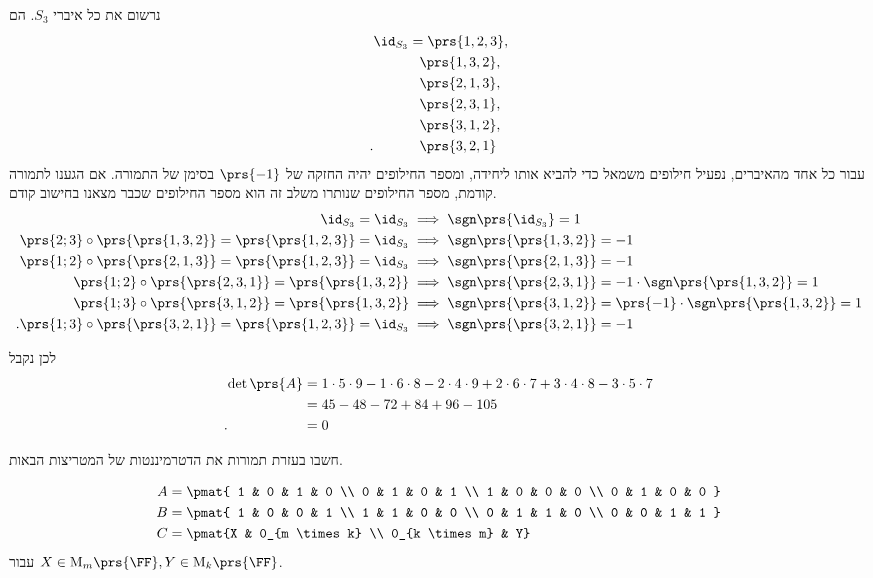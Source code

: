 \documentclass[a4paper,10pt,twoside,openany]{book}
\renewcommand{\Mat}{\mathrm{M}}
\begin{document}
\begin{solution}
נרשום את כל איברי
$S_3$.
הם
\begin{align*}
\id_{S_3} &= \prs{1, 2, 3}, \\
&\hphantom{=} \prs{1, 3, 2}, \\
&\hphantom{=} \prs{2, 1, 3}, \\
&\hphantom{=} \prs{2, 3, 1}, \\
&\hphantom{=} \prs{3, 1, 2}, \\
\text{.} \hphantom{\id_{S_3}} &\hphantom{=} \prs{3, 2, 1}
\end{align*}
עבור כל אחד מהאיברים, נפעיל חילופים משמאל כדי להביא אותו ליחידה, ומספר החילופים יהיה החזקה של $\prs{-1}$ בסימן של התמורה. אם הגענו לתמורה קודמת, מספר החילופים שנותרו משלב זה הוא מספר החילופים שכבר מצאנו בחישוב קודם.
\begin{align*}
\id_{S_3} = \id_{S_3} &\implies \sgn\prs{\id_{S_3}} = 1\\
\prs{2;3} \circ \prs{\prs{1, 3, 2}} = \prs{\prs{1, 2, 3}} = \id_{S_3} &\implies \sgn\prs{\prs{1, 3, 2}} = -1 \\
\prs{1;2} \circ \prs{\prs{2, 1, 3}} = \prs{\prs{1, 2, 3}} = \id_{S_3} &\implies \sgn\prs{\prs{2,1,3}} = -1 \\
\prs{1;2} \circ \prs{\prs{2, 3, 1}} = \prs{\prs{1, 3, 2}} &\implies \sgn\prs{\prs{2, 3, 1}} = -1 \cdot \sgn\prs{\prs{1, 3, 2}} = 1 \\
\prs{1;3} \circ \prs{\prs{3, 1, 2}} = \prs{\prs{1, 3, 2}} &\implies \sgn\prs{\prs{3, 1, 2}} = \prs{-1} \cdot \sgn\prs{\prs{1, 3, 2}} = 1 \\
\text{.} \prs{1;3} \circ \prs{\prs{3,2,1}} = \prs{\prs{1,2,3}} = \id_{S_3} &\implies \sgn\prs{\prs{3,2,1}} = -1
\end{align*}

לכן נקבל
\begin{align*}
\det\prs{A} &= 1\cdot 5 \cdot 9 - 1 \cdot 6 \cdot 8 - 2 \cdot 4 \cdot 9 + 2 \cdot 6 \cdot 7 + 3 \cdot 4 \cdot 8 - 3 \cdot 5 \cdot 7
\\&= 45 - 48 - 72 + 84 + 96 - 105
\\ \text{.} \hphantom{\det\prs{A}} &= 0
\end{align*}
\end{solution}

\begin{exercisechap}
חשבו בעזרת תמורות את הדטרמיננטות של המטריצות הבאות.

\begin{align*}
A &= \pmat{
	1 & 0 & 1 & 0 \\
	0 & 1 & 0 & 1 \\
	1 & 0 & 0 & 0 \\
	0 & 1 & 0 & 0
}
\\
B &= \pmat{
	1 & 0 & 0 & 1 \\
	1 & 1 & 0 & 0 \\
	0 & 1 & 1 & 0 \\
	0 & 0 & 1 & 1
}
\\
C &= \pmat{X & 0_{m \times k} \\ 0_{k \times m} & Y}
\end{align*}
עבור
$X \in \Mat_m\prs{\FF}, Y \in \Mat_k\prs{\FF}$.
\end{exercisechap}
\end{document}
